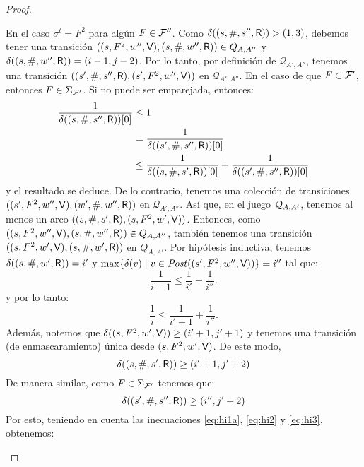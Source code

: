 \begin{proof}
\begin{description}
  En el caso $\sigma^t = F^2$ para algún $F \in \Faults''$. Como $\delta((s, \#, s'', \Refuter)) > (1,3)$,
debemos tener una transición $((s, F^2, w'', \Verifier), (s, \#, w'', \Refuter)) \in Q_{A,A''}$ y $\delta((s, \#, w'', \Refuter)) = (i-1,j-2)$. 
Por lo tanto, por definición de $\mathcal{Q}_{A',A''}$, tenemos una transición 
$((s', \#, s'', \Refuter), (s', F^2, w'', \Verifier))$ en $\mathcal{Q}_{A',A''}$. 
En el caso de que $F \in \Faults'$, entonces $F \in \Sigma_{\Faults'}$. 
Si no puede ser emparejada, entonces:
\begin{align*}
\frac{1}{\pr{0}{\delta((s,\#, s'', \Refuter))}}  & \leq 1	\\
							     &= \frac{1}{\pr{0}{\delta((s', \#, s'', \Refuter))}}  \\
							     &\leq  \frac{1}{\pr{0}{\delta((s, \#, s', \Refuter))}} +  \frac{1}{\pr{0}{\delta((s', \#, s'', \Refuter))}}   
\end{align*}
y el resultado se deduce. De lo contrario, tenemos una colección de transiciones  $((s', F^2, w'', \Verifier), (w', \#, w'', \Refuter))$ en $\mathcal{Q}_{A',A''}$. 
Así que, en el juego $\QMStrGame$, tenemos al menos un arco $((s, \#, s', \Refuter), (s, F^2, w', \Verifier))$. 
Entonces, como $((s, F^2, w'', \Verifier), (s, \#, w'', \Refuter)) \in Q_{A,A''}$, también tenemos una transición $((s, F^2, w', \Verifier), (s, \#, w', \Refuter))$ en $Q_{A,A'}$. 
Por hipótesis inductiva, tenemos $\delta((s, \#, w', \Refuter))= i'$ y $\max \{ \delta(v) \mid v \in \post((s', F^2, w'', \Verifier)) \}=i''$ tal que:
\begin{equation}\label{eq:hi1}
\frac{1}{i-1} \leq \frac{1}{i'} + \frac{1}{i''}.
\end{equation} 
y por lo tanto:
\begin{equation}\label{eq:hi1a}
\frac{1}{i} \leq \frac{1}{i'+1} + \frac{1}{i''}.
\end{equation}
Además, notemos que $\delta((s, F^2, w', \Verifier)) \geq (i'+1,j'+1)$ y tenemos una transición (de enmascaramiento) única desde $(s, F^2, w', \Verifier)$. 
De este modo, 
\begin{equation}\label{eq:hi2}
	\delta((s, \#, s', \Refuter)) \geq (i'+1,j'+2)
\end{equation}
De manera similar, como $F \in \Sigma_{\Faults'}$ tenemos que:
\begin{equation}\label{eq:hi3}
	\delta((s', \#, s'', \Refuter)) \geq (i'',j'+2)
\end{equation}
Por esto, teniendo en cuenta las inecuaciones \ref{eq:hi1a}, \ref{eq:hi2} y \ref{eq:hi3}, obtenemos:

\end{description}
\end{proof}
